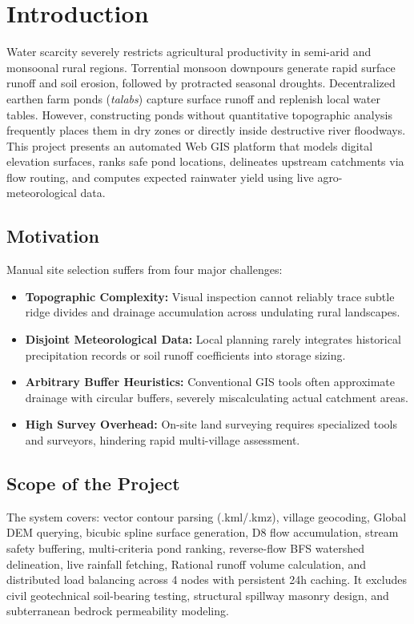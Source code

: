\documentclass[manuscript,screen,review]{acmart}
\begin{document}
\section{Introduction}
\label{sec:intro}
Water scarcity severely restricts agricultural productivity in semi-arid and monsoonal rural regions. Torrential monsoon downpours generate rapid surface runoff and soil erosion, followed by protracted seasonal droughts. Decentralized earthen farm ponds (\textit{talabs}) capture surface runoff and replenish local water tables. However, constructing ponds without quantitative topographic analysis frequently places them in dry zones or directly inside destructive river floodways. This project presents an automated Web GIS platform that models digital elevation surfaces, ranks safe pond locations, delineates upstream catchments via flow routing, and computes expected rainwater yield using live agro-meteorological data.

\subsection{Motivation}
Manual site selection suffers from four major challenges:
\begin{itemize}
    \item \textbf{Topographic Complexity:} Visual inspection cannot reliably trace subtle ridge divides and drainage accumulation across undulating rural landscapes.
    \item \textbf{Disjoint Meteorological Data:} Local planning rarely integrates historical precipitation records or soil runoff coefficients into storage sizing.
    \item \textbf{Arbitrary Buffer Heuristics:} Conventional GIS tools often approximate drainage with circular buffers, severely miscalculating actual catchment areas.
    \item \textbf{High Survey Overhead:} On-site land surveying requires specialized tools and surveyors, hindering rapid multi-village assessment.
\end{itemize}

\subsection{Scope of the Project}
The system covers: vector contour parsing (.kml/.kmz), village geocoding, Global DEM querying, bicubic spline surface generation, D8 flow accumulation, stream safety buffering, multi-criteria pond ranking, reverse-flow BFS watershed delineation, live rainfall fetching, Rational runoff volume calculation, and distributed load balancing across 4 nodes with persistent 24h caching. It excludes civil geotechnical soil-bearing testing, structural spillway masonry design, and subterranean bedrock permeability modeling.
\end{document}
